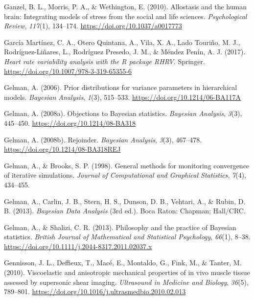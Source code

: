 \documentclass[
  english,
  man,floatsintext]{apa6}
\begin{document}
\leavevmode\hypertarget{ref-Ganzel2010}{}%
Ganzel, B. L., Morris, P. A., \& Wethington, E. (2010). Allostasis and the human brain: Integrating models of stress from the social and life sciences. \emph{Psychological Review}, \emph{117}(1), 134--174. \url{https://doi.org/10.1037/a0017773}

\leavevmode\hypertarget{ref-GarciaMartinez2017}{}%
García Martínez, C. A., Otero Quintana, A., Vila, X. A., Lado Touriño, M. J., Rodríguez-Liñares, L., Rodríguez Presedo, J. M., \& Méndez Penín, A. J. (2017). \emph{Heart rate variability analysis with the R package RHRV}. Springer. \url{https://doi.org/10.1007/978-3-319-65355-6}

\leavevmode\hypertarget{ref-Gelman2006a}{}%
Gelman, A. (2006). Prior distributions for variance parameters in hierarchical models. \emph{Bayesian Analysis}, \emph{1}(3), 515--533. \url{https://doi.org/10.1214/06-BA117A}

\leavevmode\hypertarget{ref-Gelman2008a}{}%
Gelman, A. (2008a). Objections to Bayesian statistics. \emph{Bayesian Analysis}, \emph{3}(3), 445--450. \url{https://doi.org/10.1214/08-BA318}

\leavevmode\hypertarget{ref-Gelman2008}{}%
Gelman, A. (2008b). Rejoinder. \emph{Bayesian Analysis}, \emph{3}(3), 467--478. \url{https://doi.org/10.1214/08-BA318REJ}

\leavevmode\hypertarget{ref-Gelman1998}{}%
Gelman, A., \& Brooks, S. P. (1998). General methods for monitoring convergence of iterative simulations. \emph{Journal of Computational and Graphical Statistics}, \emph{7}(4), 434--455.

\leavevmode\hypertarget{ref-Gelman2013}{}%
Gelman, A., Carlin, J. B., Stern, H. S., Dunson, D. B., Vehtari, A., \& Rubin, D. B. (2013). \emph{Bayesian Data Analysis} (3rd ed.). Boca Raton: Chapman; Hall/CRC.

\leavevmode\hypertarget{ref-Gelman2013a}{}%
Gelman, A., \& Shalizi, C. R. (2013). Philosophy and the practice of Bayesian statistics. \emph{British Journal of Mathematical and Statistical Psychology}, \emph{66}(1), 8--38. \url{https://doi.org/10.1111/j.2044-8317.2011.02037.x}

\leavevmode\hypertarget{ref-Gennisson2010}{}%
Gennisson, J. L., Deffieux, T., Macé, E., Montaldo, G., Fink, M., \& Tanter, M. (2010). Viscoelastic and anisotropic mechanical properties of in vivo muscle tissue assessed by supersonic shear imaging. \emph{Ultrasound in Medicine and Biology}, \emph{36}(5), 789--801. \url{https://doi.org/10.1016/j.ultrasmedbio.2010.02.013}
\end{document}

